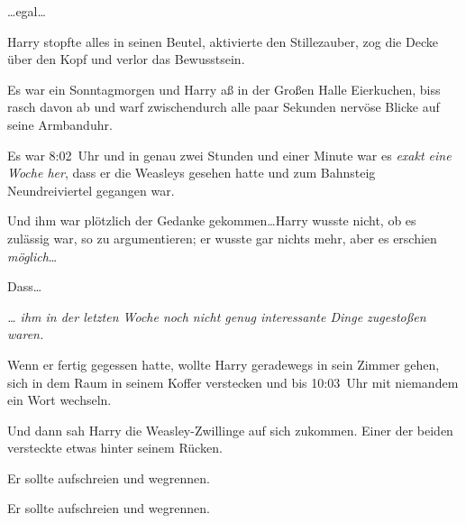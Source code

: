 …egal…

Harry stopfte alles in seinen Beutel, aktivierte den Stillezauber, zog die Decke über den Kopf und verlor das Bewusstsein.

\later

Es war ein Sonntagmorgen und Harry aß in der Großen Halle Eierkuchen, biss rasch davon ab und warf zwischendurch alle paar Sekunden nervöse Blicke auf seine Armbanduhr.

Es war 8:02~Uhr und in genau zwei Stunden und einer Minute war es \emph{exakt eine Woche her}, dass er die Weasleys gesehen hatte und zum Bahnsteig Neundreiviertel gegangen war.

Und ihm war plötzlich der Gedanke gekommen…Harry wusste nicht, ob es zulässig war, so zu argumentieren; er wusste gar nichts mehr, aber es erschien \emph{möglich}…

Dass…

\emph{… ihm in der letzten Woche noch nicht genug interessante Dinge zugestoßen waren.}

Wenn er fertig gegessen hatte, wollte Harry geradewegs in sein Zimmer gehen, sich in dem Raum in seinem Koffer verstecken und bis 10:03~Uhr mit niemandem ein Wort wechseln.

Und dann sah Harry die Weasley-Zwillinge auf sich zukommen. Einer der beiden versteckte etwas hinter seinem Rücken.

Er sollte aufschreien und wegrennen.

Er sollte aufschreien und wegrennen.

